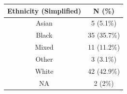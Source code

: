 \begin{table}[t]
\fontsize{12.0pt}{14.4pt}\selectfont
\begin{tabular*}{\linewidth}{@{\extracolsep{\fill}}cc}
\toprule
Ethnicity (Simplified) & N (\%) \\ 
\midrule\addlinespace[2.5pt]
Asian & 5 (5.1\%) \\ 
Black & 35 (35.7\%) \\ 
Mixed & 11 (11.2\%) \\ 
Other & 3 (3.1\%) \\ 
White & 42 (42.9\%) \\ 
NA & 2 (2\%) \\ 
\bottomrule
\end{tabular*}
\end{table}

